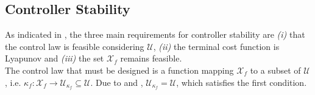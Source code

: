 \subsection{Controller Stability}
As indicated in , the three main requirements for controller stability are \textit{(i)} that the control law is feasible considering $\mathcal{U}$, \textit{(ii)} the terminal cost function is Lyapunov and \textit{(iii)} the set $\mathcal{X}_f$ remains feasible.\\
 The control law that must be designed is a function mapping $\mathcal{X}_f$ to a subset of $\mathcal{U}$, i.e. $\kappa_f:\mathcal{X}_f \rightarrow\mathcal{U}_{\kappa_f} \subseteq \mathcal{U}$. Due to  and , $\mathcal{U}_{\kappa_f} = \mathcal{U}$, which satisfies the first condition.  %

